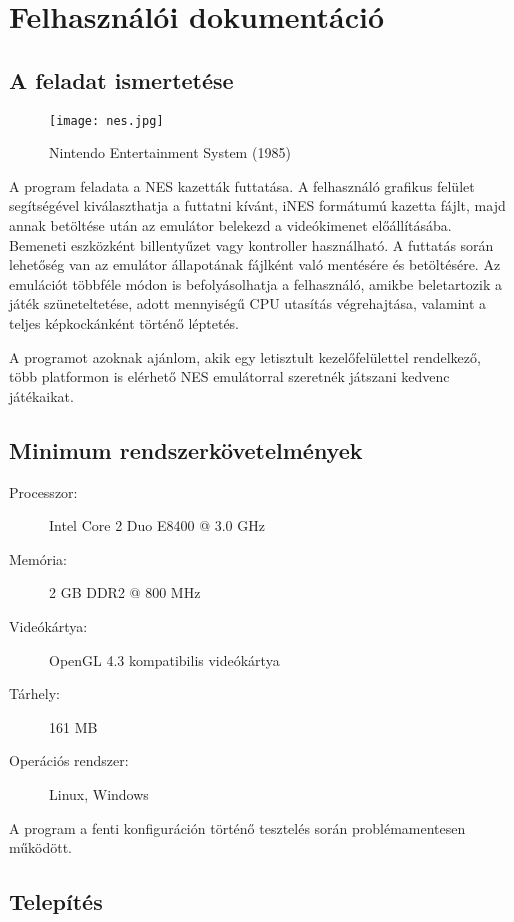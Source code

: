 \chapter{Felhasználói dokumentáció} %
\label{ch:user}

\section{A feladat ismertetése}

\begin{figure}[H]
	\centering
	\texttt{[image: nes.jpg]}
	\caption{Nintendo Entertainment System (1985)}
	\label{fig:nes}
\end{figure}

A program feladata a NES kazetták futtatása. A felhasználó grafikus felület segítségével kiválaszthatja a futtatni kívánt, iNES formátumú kazetta fájlt, majd annak betöltése után az emulátor belekezd a videókimenet előállításába. Bemeneti eszközként billentyűzet vagy kontroller használható. A futtatás során lehetőség van az emulátor állapotának fájlként való mentésére és betöltésére. Az emulációt többféle módon is befolyásolhatja a felhasználó, amikbe beletartozik a játék szüneteltetése, adott mennyiségű CPU utasítás végrehajtása, valamint a teljes képkockánként történő léptetés.

A programot azoknak ajánlom, akik egy letisztult kezelőfelülettel rendelkező, több platformon is elérhető NES emulátorral szeretnék játszani kedvenc játékaikat.

\section{Minimum rendszerkövetelmények}

\begin{description}
	\item[Processzor:] Intel Core 2 Duo E8400 @ 3.0 GHz
	\item[Memória:] 2 GB DDR2 @ 800 MHz
	\item[Videókártya:] OpenGL 4.3 kompatibilis videókártya
	\item[Tárhely:] 161 MB
	\item[Operációs rendszer:] Linux, Windows
\end{description}

A program a fenti konfiguráción történő tesztelés során problémamentesen működött.

\section{Telepítés}

